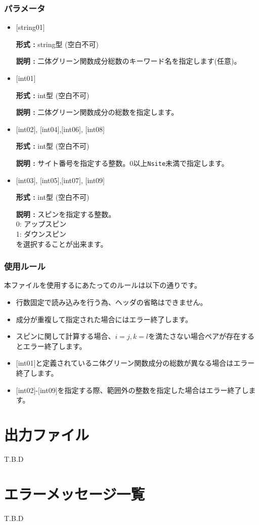 \subsubsection{パラメータ}
 \begin{itemize}

   \item  $[$string01$]$
   
    {\bf 形式 :} string型 (空白不可)

   {\bf 説明 :} 二体グリーン関数成分総数のキーワード名を指定します(任意)。

   \item  $[$int01$]$
   
    {\bf 形式 :} int型 (空白不可)

   {\bf 説明 :} 二体グリーン関数成分の総数を指定します。

  \item  $[$int02$]$, $[$int04$]$,$[$int06$]$, $[$int08$]$

 {\bf 形式 :} int型 (空白不可)

{\bf 説明 :} サイト番号を指定する整数。0以上\verb|Nsite|{未満}で指定します。
 
  \item  $[$int03$]$, $[$int05$]$,$[$int07$]$, $[$int09$]$

 {\bf 形式 :} int型 (空白不可)

{\bf 説明 :} スピンを指定する整数。\\
0: アップスピン\\
1: ダウンスピン\\
を選択することが出来ます。

\end{itemize}

\subsubsection{使用ルール}
本ファイルを使用するにあたってのルールは以下の通りです。
\begin{itemize}
\item 行数固定で読み込みを行う為、ヘッダの省略はできません。
\item 成分が重複して指定された場合にはエラー終了します。
\item {スピンに関して計算する場合、$i=j, k=l$を満たさない場合ペアが存在するとエラー終了します。}
\item $[$int01$]$と定義されているニ体グリーン関数成分の総数が異なる場合はエラー終了します。
\item $[$int02$]$-$[$int09$]$を指定する際、範囲外の整数を指定した場合はエラー終了します。
\end{itemize}

\newpage
\section{出力ファイル}
\label{Sec:outputfile}
T.B.D
\newpage
\section{エラーメッセージ一覧}
T.B.D
